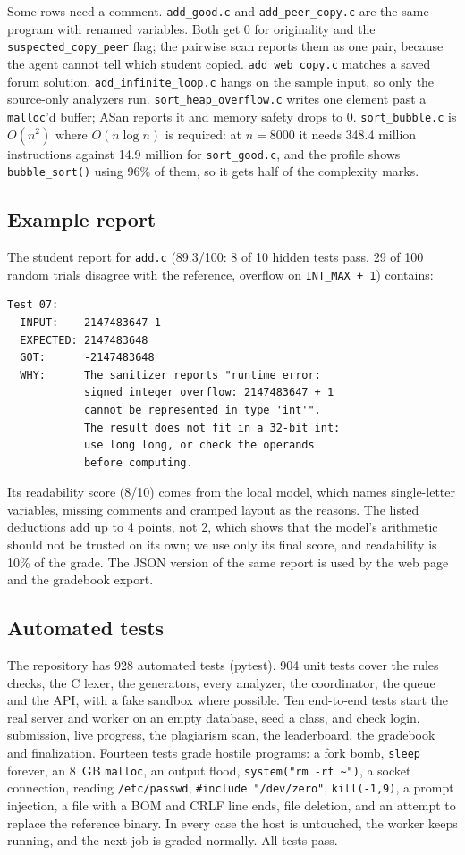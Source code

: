 \documentclass[conference]{IEEEtran}
\newcommand{\code}[1]{\texttt{#1}}
\begin{document}


Some rows need a comment. \code{add\_good.c} and \code{add\_peer\_copy.c} are the same program
with renamed variables. Both get 0 for originality and the \code{suspected\_copy\_peer} flag;
the pairwise scan reports them as one pair, because the agent cannot tell which student copied.
\code{add\_web\_copy.c} matches a saved forum solution. \code{add\_infinite\_loop.c} hangs on the
sample input, so only the source-only analyzers run. \code{sort\_heap\_overflow.c} writes one
element past a \code{malloc}'d buffer; ASan reports it and memory safety drops to 0.
\code{sort\_bubble.c} is $O(n^2)$ where $O(n\log n)$ is required: at $n=8000$ it needs 348.4
million instructions against 14.9 million for \code{sort\_good.c}, and the profile shows
\code{bubble\_sort()} using 96\% of them, so it gets half of the complexity marks.

\subsection{Example report}
The student report for \code{add.c} (89.3/100: 8 of 10 hidden tests pass, 29 of 100 random
trials disagree with the reference, overflow on \code{INT\_MAX + 1}) contains:
\begin{lstlisting}
Test 07:
  INPUT:    2147483647 1
  EXPECTED: 2147483648
  GOT:      -2147483648
  WHY:      The sanitizer reports "runtime error:
            signed integer overflow: 2147483647 + 1
            cannot be represented in type 'int'".
            The result does not fit in a 32-bit int:
            use long long, or check the operands
            before computing.
\end{lstlisting}
Its readability score (8/10) comes from the local model, which names single-letter
variables, missing comments and cramped layout as the reasons. The listed deductions add up to
4 points, not 2, which shows that the model's arithmetic should not be trusted on its own; we
use only its final score, and readability is 10\% of the grade.
The JSON version of the same report is used by the web page and the gradebook export.

\subsection{Automated tests}
The repository has 928 automated tests (pytest). 904 unit tests cover the rules checks, the C
lexer, the generators, every analyzer, the coordinator, the queue and the API, with a fake
sandbox where possible. Ten end-to-end tests start the real server and worker on an empty
database, seed a class, and check login, submission, live progress, the plagiarism scan, the
leaderboard, the gradebook and finalization. Fourteen tests grade hostile programs: a fork
bomb, \code{sleep} forever, an 8~GB \code{malloc}, an output flood, \code{system("rm -rf \textasciitilde")},
a socket connection, reading \code{/etc/passwd}, \code{\#include "/dev/zero"}, \code{kill(-1,9)},
a prompt injection, a file with a BOM and CRLF line ends, file deletion, and an attempt to
replace the reference binary. In every case the host is untouched, the worker keeps running, and
the next job is graded normally. All tests pass.
\end{document}
